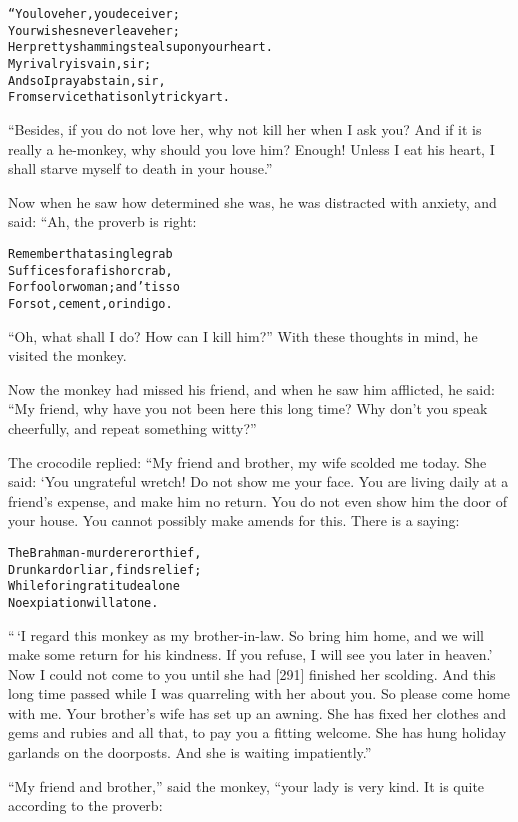 \documentclass{article}
\renewenvironment{verbatim}{\begin{alltt}\normalfont\begin{centering}}{\end{centering}\end{alltt}}
\begin{document}
\begin{verbatim}
“You love her, you deceiver;
Your wishes never leave her;
Her pretty shamming steals upon your heart.
    My rivalry is vain, sir;
    And so I pray abstain, sir,
From service that is only tricky art.
\end{verbatim}
``Besides, if you do not love her, why not kill her when I ask you? And if it is really a he-monkey, why should you love him? Enough! Unless I eat his heart, I shall starve myself to death in your house.''

Now when he saw how determined she was, he was distracted with
anxiety, and said: “Ah, the proverb is right:

\begin{verbatim}
Remember that a single grab
Suffices for a fish or crab,
For fool or woman; and 'tis so
For sot, cement, or indigo.
\end{verbatim}
``Oh, what shall I do? How can I kill him?'' With these thoughts in
mind, he visited the monkey.

Now the monkey had missed his friend, and when he saw him
afflicted, he said:
``My friend, why have you not been here this long time? Why don't you speak cheerfully, and repeat something witty?''

The crocodile replied: “My friend and brother, my wife scolded me
today. She said: ‘You ungrateful wretch! Do not show me your face.
You are living daily at a friend's expense, and make him no return.
You do not even show him the door of your house. You cannot
possibly make amends for this. There is a saying:

\begin{verbatim}
The Brahman-murderer or thief,
Drunkard or liar, finds relief;
While for ingratitude alone
No expiation will atone.
\end{verbatim}
``\,`I regard this monkey as my brother-in-law. So bring him home, and we will make some return for his kindness. If you refuse, I will see you later in heaven.' Now I could not come to you until she had [291] finished her scolding. And this long time passed while I was quarreling with her about you. So please come home with me. Your brother's wife has set up an awning. She has fixed her clothes and gems and rubies and all that, to pay you a fitting welcome. She has hung holiday garlands on the doorposts. And she is waiting impatiently.''

``My friend and brother,'' said the monkey, “your lady is very
kind. It is quite according to the proverb:
\end{document}
